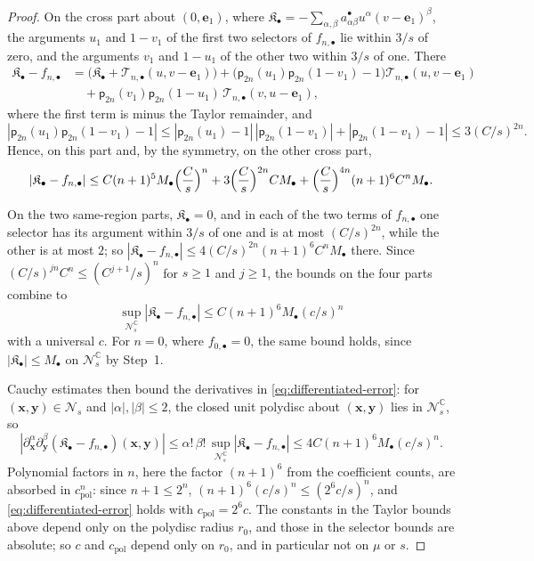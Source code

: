 \documentclass[11pt]{amsart}
\numberwithin{equation}{section}
\theoremstyle{definition}
\newcommand{\C}{\mathbb C}
\newcommand{\bx}{\mathbf x}
\newcommand{\by}{\mathbf y}
\newcommand{\eone}{\mathbf e_1}
\begin{document}
\begin{proof}
On the cross part about \((0,\eone)\), where
\(\mathfrak K_\bullet=-\sum_{\alpha,\beta}a^\bullet_{\alpha\beta}
u^\alpha(v-\eone)^\beta\), the arguments \(u_1\) and \(1-v_1\) of the
first two selectors of \(f_{n,\bullet}\) lie within \(3/s\) of zero,
and the arguments \(v_1\) and \(1-u_1\) of the other two within \(3/s\)
of one. There
\begin{align*}
 \mathfrak K_\bullet-f_{n,\bullet}
 &=\bigl(\mathfrak K_\bullet+\mathcal T_{n,\bullet}(u,v-\eone)\bigr)
 +\bigl(\mathsf p_{2n}(u_1)\mathsf p_{2n}(1-v_1)-1\bigr)
  \mathcal T_{n,\bullet}(u,v-\eone)\\
 &\quad+\mathsf p_{2n}(v_1)\mathsf p_{2n}(1-u_1)\,
  \mathcal T_{n,\bullet}(v,u-\eone),
\end{align*}
where the first term is minus the Taylor remainder, and
\[
 |\mathsf p_{2n}(u_1)\mathsf p_{2n}(1-v_1)-1|
 \le|\mathsf p_{2n}(u_1)-1|\,|\mathsf p_{2n}(1-v_1)|
 +|\mathsf p_{2n}(1-v_1)-1|\le3(C/s)^{2n}.
\]
Hence, on this part and,
by the symmetry, on the other cross part,
\[
 |\mathfrak K_\bullet-f_{n,\bullet}|
 \le C(n+1)^5M_\bullet\Bigl(\frac Cs\Bigr)^n
 +3\Bigl(\frac Cs\Bigr)^{2n}CM_\bullet
 +\Bigl(\frac Cs\Bigr)^{4n}(n+1)^6C^nM_\bullet .
\]

On the two same-region parts, \(\mathfrak K_\bullet=0\), and in each of
the two terms of \(f_{n,\bullet}\) one selector has its argument
within \(3/s\) of one and is at most \((C/s)^{2n}\), while the other is
at most \(2\); so
\(|\mathfrak K_\bullet-f_{n,\bullet}|\le4(C/s)^{2n}(n+1)^6C^nM_\bullet\)
there. Since \((C/s)^{jn}C^n\le(C^{j+1}/s)^n\) for \(s\ge1\) and
\(j\ge1\), the bounds on the four parts combine to
\[
 \sup_{\mathcal N_s^{\C}}|\mathfrak K_\bullet-f_{n,\bullet}|
 \le C(n+1)^6M_\bullet(c/s)^n
\]
with a universal \(c\). For \(n=0\), where \(f_{0,\bullet}=0\), the
same bound holds, since \(|\mathfrak K_\bullet|\le M_\bullet\) on
\(\mathcal N_s^{\C}\) by Step~1.

Cauchy estimates then bound the derivatives in
\eqref{eq:differentiated-error}: for \((\bx,\by)\in\mathcal N_s\) and
\(|\alpha|,|\beta|\le2\), the closed unit polydisc about
\((\bx,\by)\) lies in \(\mathcal N_s^{\C}\), so
\[
 |\partial_\bx^\alpha\partial_\by^\beta
 (\mathfrak K_\bullet-f_{n,\bullet})(\bx,\by)|
 \le\alpha!\,\beta!\,
 \sup_{\mathcal N_s^{\C}}|\mathfrak K_\bullet-f_{n,\bullet}|
 \le4C(n+1)^6M_\bullet(c/s)^n .
\]
Polynomial factors in \(n\), here the factor \((n+1)^6\) from the
coefficient counts, are absorbed in \(c_{\mathrm{pol}}^n\): since
\(n+1\le2^n\), \((n+1)^6(c/s)^n\le(2^6c/s)^n\), and
\eqref{eq:differentiated-error} holds with \(c_{\mathrm{pol}}=2^6c\).
The constants in the Taylor bounds above depend only on the polydisc
radius \(r_0\), and those in the selector bounds are absolute; so \(c\)
and \(c_{\mathrm{pol}}\) depend only on \(r_0\), and in particular not on
\(\mu\) or \(s\).


\end{proof}
\end{document}
